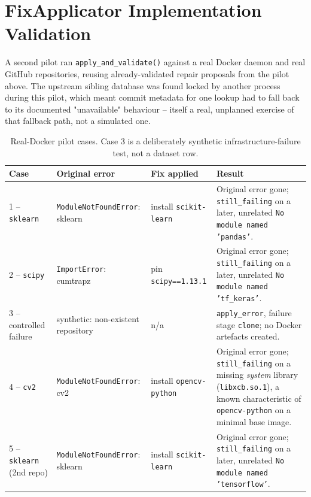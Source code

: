 \section{FixApplicator Implementation Validation}
\label{sec:v-i5}

A second pilot ran \texttt{apply\_and\_validate()} against a real Docker
daemon and real GitHub repositories, reusing already-validated repair
proposals from the pilot above. The upstream sibling database was found
locked by another process during this pilot, which meant commit metadata
for one lookup had to fall back to its documented "unavailable" behaviour --
itself a real, unplanned exercise of that fallback path, not a simulated
one.

\begin{table}[h]
  \centering
  \small
  \begin{tabular}{|p{1.7cm}|p{3.2cm}|p{2.6cm}|p{6.0cm}|}
    \hline
    \textbf{Case} & \textbf{Original error} & \textbf{Fix applied} & \textbf{Result} \\
    \hline
    1 -- \texttt{sklearn} & \texttt{ModuleNot\-FoundError}: sklearn & install \texttt{scikit-learn} &
      Original error gone; \texttt{still\_failing} on a later, unrelated \texttt{No module named 'pandas'}. \\
    \hline
    2 -- \texttt{scipy} & \texttt{ImportError}: cumtrapz & pin \texttt{scipy==1.13.1} &
      Original error gone; \texttt{still\_failing} on a later, unrelated \texttt{No module named 'tf\_keras'}. \\
    \hline
    3 -- controlled failure & synthetic: non-existent repository & n/a &
      \texttt{apply\_error}, failure stage \texttt{clone}; no Docker artefacts created. \\
    \hline
    4 -- \texttt{cv2} & \texttt{ModuleNot\-FoundError}: cv2 & install \texttt{opencv-python} &
      Original error gone; \texttt{still\_failing} on a missing \emph{system} library (\texttt{libxcb.so.1}), a known characteristic of \texttt{opencv-python} on a minimal base image. \\
    \hline
    5 -- \texttt{sklearn} (2nd repo) & \texttt{ModuleNot\-FoundError}: sklearn & install \texttt{scikit-learn} &
      Original error gone; \texttt{still\_failing} on a later, unrelated \texttt{No module named 'tensorflow'}. \\
    \hline
  \end{tabular}
  \caption{Real-Docker pilot cases. Case 3 is a deliberately synthetic
  infrastructure-failure test, not a dataset row.}
  \label{tab:v-i5-cases}
\end{table}

